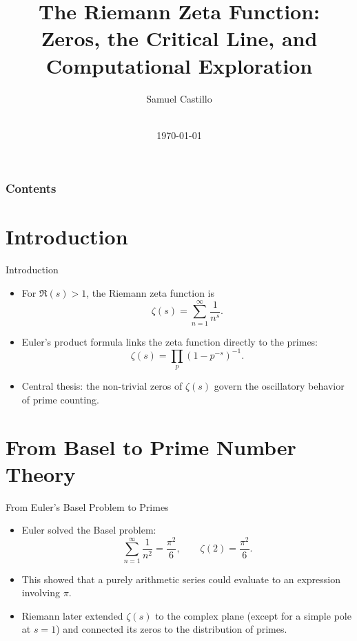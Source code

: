 \documentclass[aspectratio=43]{beamer}
\title[\meetingname]{The Riemann Zeta Function: Zeros, the Critical Line, and Computational Exploration}
\author[G Shan]{Samuel Castillo}
\institute[UMass Amherst]{University of Massachusetts Amherst}
\date[\mydate]{\meetingname\\\today}
\begin{document}
\begin{frame}[plain,t]
\titlepage
\end{frame}

\begin{frame}
\frametitle{Contents}
\tableofcontents
\end{frame}

\section{Introduction}

\begin{frame}{Introduction}
\begin{itemize}
    \item For $\Re(s)>1$, the Riemann zeta function is
    \[
    \zeta(s)=\sum_{n=1}^{\infty}\frac{1}{n^s}.
    \]
    \item Euler's product formula links the zeta function directly to the primes:
    \[
    \zeta(s)=\prod_p\left(1-p^{-s}\right)^{-1}.
    \]
    \item Central thesis: the non-trivial zeros of $\zeta(s)$ govern the oscillatory behavior of prime counting.
\end{itemize}
\end{frame}

\section{From Basel to Prime Number Theory}

\begin{frame}{From Euler's Basel Problem to Primes}
\begin{itemize}
    \item Euler solved the Basel problem:
    \[
    \sum_{n=1}^{\infty}\frac{1}{n^2}=\frac{\pi^2}{6},\qquad \zeta(2)=\frac{\pi^2}{6}.
    \]
    \item This showed that a purely arithmetic series could evaluate to an expression involving $\pi$.
    \item Riemann later extended $\zeta(s)$ to the complex plane (except for a simple pole at $s=1$) and connected its zeros to the distribution of primes.
\end{itemize}
\end{frame}
\end{document}
